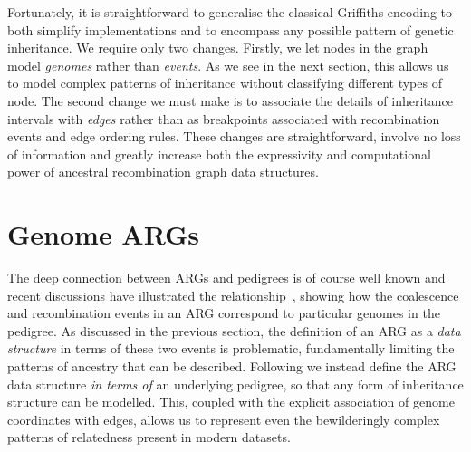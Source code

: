 \documentclass{article}
\begin{document}
Fortunately, it is straightforward to generalise the classical Griffiths
encoding to both simplify implementations and to encompass any
possible pattern of genetic inheritance.
We require only two changes. Firstly, we let nodes in the
graph model \emph{genomes} rather than \emph{events}. As we
see in the next section, this allows us to model complex
patterns of inheritance without classifying different types of node.
The second change we must make is to associate
the details of inheritance intervals with \emph{edges} rather than
as breakpoints associated with recombination events and
edge ordering rules.
These changes are straightforward, involve no loss of information
and greatly increase both the expressivity and computational
power of ancestral recombination graph data structures.

\section*{Genome ARGs}
The deep connection between ARGs and pedigrees is of course
well known
\citep[e.g.][]{wakeley2012genetics,gusfield2014recombinatorics,
speed2015naturereviewsgenetics}
and recent discussions have illustrated the
relationship~\citep{mathieson2020ancestry,brandt2021evaluation}, %
showing how the coalescence and recombination events in an ARG
correspond to particular genomes in the pedigree.
As discussed in the previous section, the definition of an ARG
as a \emph{data structure} in terms of these two events is problematic,
fundamentally limiting the patterns of ancestry that can be described.
Following \cite{mathieson2020ancestry} we instead define the
ARG data structure \emph{in terms of} an underlying pedigree, so that
any form of inheritance structure can be modelled.
This, coupled with
the explicit association of genome coordinates with edges, allows
us to represent even the bewilderingly complex patterns of relatedness
present in modern datasets.
\end{document}
